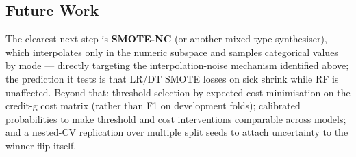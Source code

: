 \subsection{Future Work}

The clearest next step is \textbf{SMOTE-NC} (or another mixed-type synthesiser), which interpolates only in the numeric subspace and samples categorical values by mode --- directly targeting the interpolation-noise mechanism identified above; the prediction it tests is that LR/DT SMOTE losses on sick shrink while RF is unaffected. Beyond that: threshold selection by expected-cost minimisation on the credit-g cost matrix (rather than F1 on development folds); calibrated probabilities to make threshold and cost interventions comparable across models; and a nested-CV replication over multiple split seeds to attach uncertainty to the winner-flip itself.
